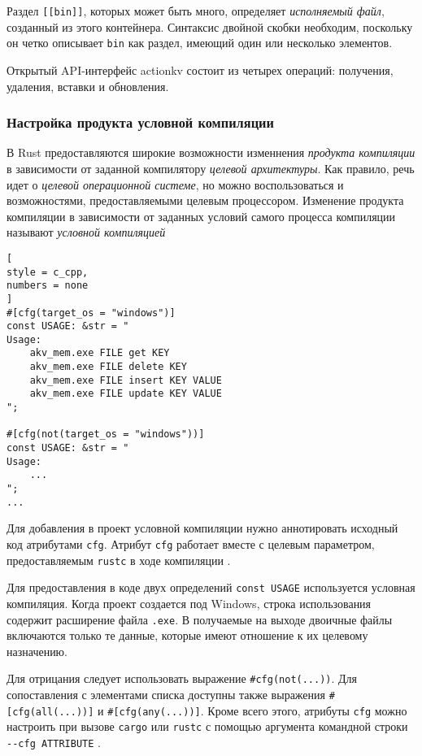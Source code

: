 \documentclass[%
	11pt,
	a4paper,
	utf8,
		]{article}
\begin{document}
Раздел \verb|[[bin]]|, которых может быть много, определяет \emph{исполняемый файл}, созданный из этого контейнера. Синтаксис двойной скобки необходим, поскольку он четко описывает \verb|bin| как раздел, имеющий один или несколько элементов.

Открытый API-интерфейс actionkv состоит из четырех операций: получения, удаления, вставки и обновления.

\subsubsection{Настройка продукта условной компиляции}

В Rust предоставляются широкие возможности изменнения \emph{продукта компиляции} в зависимости от заданной компилятору \emph{целевой архитектуры}. Как правило, речь идет о \emph{целевой операционной системе}, но можно воспользоваться и возможностями, предоставляемыми целевым процессором. Изменение продукта компиляции в зависимости от заданных условий самого процесса компиляции называют \emph{условной компиляцией}
\begin{lstlisting}[
style = c_cpp,
numbers = none
]
#[cfg(target_os = "windows")]
const USAGE: &str = "
Usage:
    akv_mem.exe FILE get KEY
    akv_mem.exe FILE delete KEY
    akv_mem.exe FILE insert KEY VALUE
    akv_mem.exe FILE update KEY VALUE
";

#[cfg(not(target_os = "windows"))]
const USAGE: &str = "
Usage:
    ...
";
...
\end{lstlisting}

{\color{blue}
Для добавления в проект условной компиляции нужно аннотировать исходный код атрибутами \verb|cfg|. Атрибут \verb|cfg| работает вместе с целевым параметром, предоставляемым \verb|rustc| в ходе компиляции \cite[]{mcnamara-rust-in-action:2023}.
}

Для предоставления в коде двух определений \verb|const USAGE| используется условная компиляция. Когда проект создается под Windows, строка использования содержит расширение файла \verb|.exe|. В получаемые на выходе двоичные файлы включаются только те данные, которые имеют отношение к их целевому назначению.

Для отрицания следует использовать выражение \verb|#cfg(not(...))|. Для сопоставления с элементами списка доступны также выражения \verb|#[cfg(all(...))]| и \verb|#[cfg(any(...))]|. Кроме всего этого, атрибуты \verb|cfg| можно настроить при вызове \verb|cargo| или \verb|rustc| с помощью аргумента командной строки \verb|--cfg ATTRIBUTE| \cite[]{mcnamara-rust-in-action:2023}.
\end{document}
